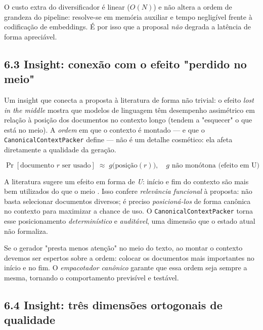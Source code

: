 \begin{pontochave}
O custo extra do diversificador é linear ($O(N)$) e não altera a ordem de
grandeza do pipeline: resolve-se em memória auxiliar e tempo negligível frente à
codificação de embeddings. É por isso que a proposal \emph{não} degrada a
latência de forma apreciável.
\end{pontochave}

\subsection*{6.3 Insight: conexão com o efeito "perdido no meio"}

 Um insight que conecta a proposta à literatura de forma não trivial: o
efeito \emph{lost in the middle} \cite{Liu2024LostMiddle} mostra que modelos de
linguagem têm desempenho assimétrico em relação à posição dos documentos no
contexto longo (tendem a "esquecer" o que está no meio). A \emph{ordem} em que o
contexto é montado --- e que o \texttt{CanonicalContextPacker} define --- não é um
detalhe cosmético: ela afeta diretamente a qualidade da geração.

\begin{equation}
\label{eq:positional}
\Pr[\text{documento } r \text{ ser usado}] \;\approx\;
g\bigl(\text{posição}(r)\bigr),\quad
g \text{ não monótona (efeito em U)}
\end{equation}

\noindent A literatura sugere um efeito em forma de \emph{U}: início e fim do
contexto são mais bem utilizados do que o meio \cite{Liu2024LostMiddle}. Isso
confere \emph{relevância funcional} à proposta: não basta selecionar documentos
diversos; é preciso \emph{posicioná-los} de forma canônica no contexto para
maximizar a chance de uso. O \texttt{CanonicalContextPacker} torna esse
posicionamento \emph{determinístico} e \emph{auditável}, uma dimensão que o
estado atual não formaliza.

\begin{intuicao}
Se o gerador "presta menos atenção" no meio do texto, ao montar o contexto
devemos ser espertos sobre a ordem: colocar os documentos mais importantes no
início e no fim. O \emph{empacotador canônico} garante que essa ordem seja sempre
a mesma, tornando o comportamento previsível e testável.
\end{intuicao}

\subsection*{6.4 Insight: três dimensões ortogonais de qualidade}

